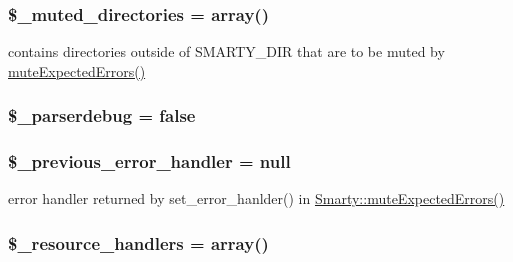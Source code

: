 \subsubsection[{\$\+\_\+muted\+\_\+directories}]{\setlength{\rightskip}{0pt plus 5cm}\$\+\_\+muted\+\_\+directories = array()\hspace{0.3cm}{\ttfamily [static]}}\label{class_smarty_abb10f08cd280a1b7e1b2e6cb6afc460c}
contains directories outside of S\+M\+A\+R\+T\+Y\+\_\+\+D\+I\+R that are to be muted by \hyperlink{class_smarty_a3c60bb37676992fdc406b34476168f9e}{mute\+Expected\+Errors()} \hypertarget{class_smarty_acb80fdbc8948da9101789788487b83ac}{}
\subsubsection[{\$\+\_\+parserdebug}]{\setlength{\rightskip}{0pt plus 5cm}\$\+\_\+parserdebug = false}\label{class_smarty_acb80fdbc8948da9101789788487b83ac}
\hypertarget{class_smarty_a249a4c3134b46c30b8e3f4f2d097e862}{}
\subsubsection[{\$\+\_\+previous\+\_\+error\+\_\+handler}]{\setlength{\rightskip}{0pt plus 5cm}\$\+\_\+previous\+\_\+error\+\_\+handler = null\hspace{0.3cm}{\ttfamily [static]}}\label{class_smarty_a249a4c3134b46c30b8e3f4f2d097e862}
error handler returned by set\+\_\+error\+\_\+hanlder() in \hyperlink{class_smarty_a3c60bb37676992fdc406b34476168f9e}{Smarty\+::mute\+Expected\+Errors()} \hypertarget{class_smarty_a8cb2cadafe33d876bcc5eab54aa8ccbf}{}
\subsubsection[{\$\+\_\+resource\+\_\+handlers}]{\setlength{\rightskip}{0pt plus 5cm}\$\+\_\+resource\+\_\+handlers = array()}\label{class_smarty_a8cb2cadafe33d876bcc5eab54aa8ccbf}
\hypertarget{class_smarty_a8b74cd5266386c9651f86d02b4bf3bc4}{}
